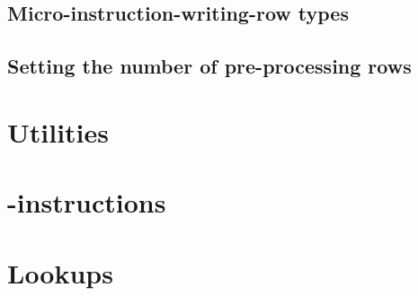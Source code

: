 \subsection{Micro-instruction-writing-row types}            \label{mmu: constraints: row types}                                
\subsection{Setting the number of pre-processing rows}      \label{mmu: constraints: number of pre processing rows}            

\section{Utilities}                                         \label{mmu: utilities}                                             

\section{\mmuMod{}-instructions}                            \label{mmu: instructions}                                          

\section{Lookups}                                           \label{mmu: lookups}                                               
